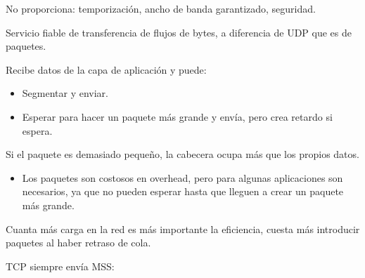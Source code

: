 \documentclass[12pt, twoside, openright]{report} %
\begin{document}
No proporciona: temporización, ancho de banda garantizado,
seguridad.

Servicio fiable de transferencia de flujos de bytes, a diferencia de
UDP que es de paquetes.

Recibe datos de la capa de aplicación y puede:

\begin{itemize}
	\item Segmentar y enviar.
	\item Esperar para hacer un paquete más grande y envía, pero crea
	      retardo si espera.
\end{itemize}

Si el paquete es demasiado pequeño, la cabecera ocupa más que los
propios datos.

\begin{itemize}
	\item Los paquetes son costosos en overhead, pero para algunas
	      aplicaciones son necesarios, ya que no pueden esperar hasta que
	      lleguen a crear un paquete más grande.
\end{itemize}

Cuanta más carga en la red es más importante la eficiencia, cuesta
más introducir paquetes al haber retraso de cola.

TCP siempre envía MSS:
\end{document}
